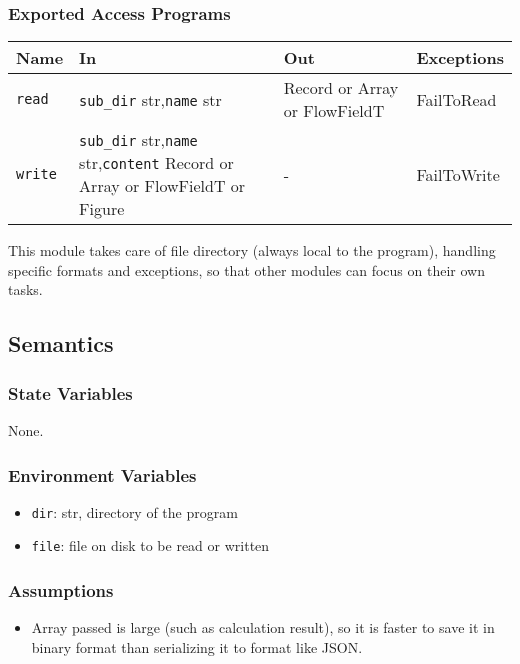 \documentclass[12pt, titlepage]{article}
\begin{document}
\subsubsection{Exported Access Programs}

\begin{center}
\begin{tabular}{p{2cm} p{5cm} p{3cm} p{4cm}}
\hline
\textbf{Name} & \textbf{In} & \textbf{Out} & \textbf{Exceptions} \\
\hline
\texttt{read} & \texttt{sub\_dir} str,\newline\texttt{name} str & Record or Array or FlowFieldT & FailToRead \\
\texttt{write} & \texttt{sub\_dir} str,\newline\texttt{name} str,\newline\texttt{content} Record or Array or FlowFieldT or Figure & - & FailToWrite \\
\hline
\end{tabular}
\end{center}

\noindent This module takes care of file directory (always local to the program), handling specific formats and exceptions, so that other modules can focus on their own tasks.

\subsection{Semantics}

\subsubsection{State Variables}
None.

\subsubsection{Environment Variables}
\begin{itemize}
  \item \texttt{dir}: str, directory of the program
  \item \texttt{file}: file on disk to be read or written
\end{itemize}

\subsubsection{Assumptions}
\begin{itemize}
  \item Array passed is large (such as calculation result), so it is faster to save it in binary format than serializing it to format like JSON.
\end{itemize}
\end{document}
